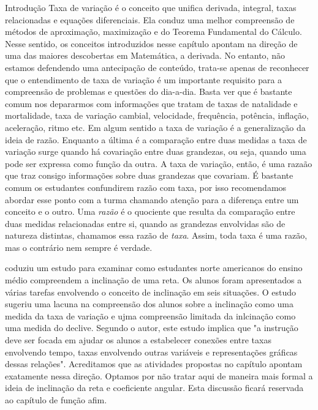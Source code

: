 \begin{apresentacao}{Introdução}
Taxa de variação é o conceito que unifica derivada, integral, taxas relacionadas e equações diferenciais. Ela conduz uma melhor compreensão de métodos de aproximação, maximização e do Teorema Fundamental do Cálculo. Nesse sentido, os conceitos introduzidos nesse capítulo apontam na direção de uma das maiores descobertas em Matemática, a derivada. No entanto, não estamos defendendo uma antecipação de conteúdo, trata-se apenas de reconhecer que o entendimento de taxa de variação é um importante requisito para a compreensão de problemas e questões do dia-a-dia. Basta ver que é bastante comum nos depararmos com informações que tratam de taxas de natalidade e mortalidade, taxa de variação cambial, velocidade, frequência, potência, inflação, aceleração, ritmo etc. Em algum sentido a taxa de variação é a generalização da ideia de razão. Enquanto a última é a comparação entre duas medidas a taxa de variação surge quando há covariação entre duas grandezas, ou seja, quando uma pode ser expressa como função da outra. A taxa de variação, então, é uma razaão que traz consigo informações sobre duas grandezas que covariam. É bastante comum os estudantes confundirem razão com taxa, por isso recomendamos abordar esse ponto com a turma chamando atenção para a diferença entre um conceito e o outro. Uma \textit{razão} é o quociente que resulta da comparação entre duas medidas relacionadas entre si, quando as grandezas envolvidas são de natureza distintas, chamamos essa razão de \textit{taxa}. Assim, toda taxa é uma razão, mas o contrário nem sempre é verdade.

\cite[p.87]{stump2001} coduziu um estudo para examinar como estudantes norte americanos do ensino médio compreendem a inclinação de uma reta. Os alunos foram apresentados a várias tarefas envolvendo o conceito de inclinação em seis situações. O estudo sugeriu uma lacuna na compreensão dos alunos sobre a inclinação como uma medida da taxa de variação e ujma compreensão limitada da inlcinação como uma medida do declive. Segundo o autor, este estudo implica que "a instrução deve ser focada em ajudar os alunos a estabelecer conexões entre taxas envolvendo tempo, taxas envolvendo outras variáveis e representações gráficas dessas relações". Acreditamos que as atividades propostas no capítulo apontam exatamente nessa direção. Optamos por não tratar aqui de maneira mais formal a ideia de inclinação da reta e coeficiente angular. Esta discussão ficará reservada ao capítulo de função afim.


\end{apresentacao}
